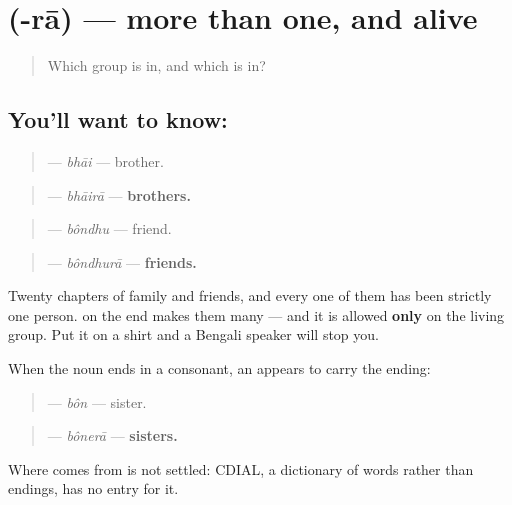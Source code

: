 \section[\texorpdfstring{\bn{রা} (-rā)}{রা (-rā)}]{ (-rā) — more than one, and alive}

\label{lesson:BN-C22-ra}



\begin{quote}
Which group is \textbf{} in, and which is \textbf{} in?
\end{quote}

\subsection*{You'll want to know: }
\begin{quote}
\textbf{} — \emph{bhāi} — brother.
\end{quote}

\begin{quote}
\textbf{} — \emph{bhāirā} — \textbf{brothers.}
\end{quote}

\begin{quote}
\textbf{} — \emph{bôndhu} — friend.
\end{quote}

\begin{quote}
\textbf{} — \emph{bôndhurā} — \textbf{friends.}
\end{quote}

Twenty chapters of family and friends, and every one of them has been strictly one person. \textbf{} on the end makes them many — and it is allowed \textbf{only} on the living group. Put it on a shirt and a Bengali speaker will stop you.

When the noun ends in a consonant, an \textbf{} appears to carry the ending:

\begin{quote}
\textbf{} — \emph{bôn} — sister.
\end{quote}

\begin{quote}
\textbf{} — \emph{bônerā} — \textbf{sisters.}
\end{quote}

\begin{cousinweb}
Where \textbf{} comes from is not settled: CDIAL, a dictionary of words rather than endings, has no entry for it.
\end{cousinweb}

